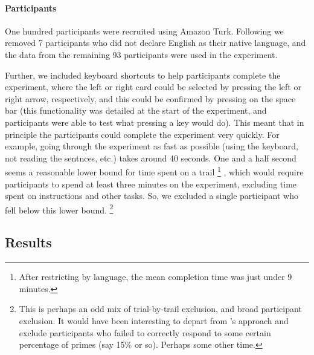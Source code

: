 \documentclass[10pt]{article}
\begin{document}
\begin{multicols}{2}
\paragraph{Participants}

One hundred participants were recruited using Amazon Turk.
Following \citeauthor{Bott:2016aa} we removed 7 participants who did not declare English as their native language, and the data from the remaining 93 participants were used in the experiment.

Further, we included keyboard shortcuts to help participants complete the experiment, where the left or right card could be selected by pressing the left or right arrow, respectively, and this could be confirmed by pressing on the space bar (this functionality was detailed at the start of the experiment, and participants were able to test what pressing a key would do).
  This meant that in principle the participants could complete the experiment very quickly.
  For example, going through the experiment as fast as possible (using the keyboard, not reading the sentnces, etc.) takes around 40 seconds.
  One and a half second seems a reasonable lower bound for time spent on a trail\nolinebreak
  \footnote{After restricting by language, the mean completion time was just under 9 minutes.}\nolinebreak
  , which would require participants to spend at least three minutes on the experiment, excluding time spent on instructions and other tasks.
  So, we excluded a single participant who fell below this lower bound.\nolinebreak
  \footnote{This is perhaps an odd mix of trial-by-trail exclusion, and broad participant exclusion.
    It would have been interesting to depart from \citeauthor{Bott:2016aa}'s approach and exclude participants who failed to correctly respond to some certain percentage of primes (say 15\% or so).
  Perhaps some other time.}


\subsection{Results}
\label{sec:results}


\end{multicols}
\end{document}
